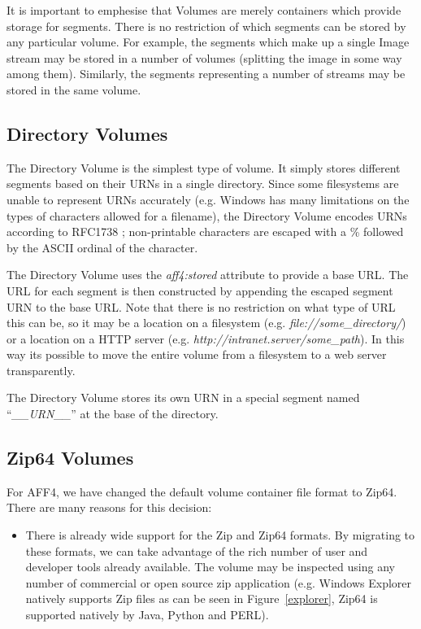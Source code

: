 \documentclass[10pt, conference]{IEEEtran}
\begin{document}
{{It is important to emphesise that Volumes are merely containers which
provide storage for segments. There is no restriction of which
segments can be stored by any particular volume. For example, the
segments which make up a single Image stream may be stored in a number
of volumes (splitting the image in some way among them). Similarly,
the segments representing a number of streams may be stored in the
same volume.

\subsection{Directory Volumes}
The Directory Volume is the simplest type of volume. It simply stores
different segments based on their URNs in a single directory. Since
some filesystems are unable to represent URNs accurately (e.g. Windows
has many limitations on the types of characters allowed for a
filename), the Directory Volume encodes URNs according to RFC1738
\cite{RFC1738}; non-printable characters are escaped with a \%
followed by the ASCII ordinal of the character.

The Directory Volume uses the {\em aff4:stored} attribute to provide a
base URL. The URL for each segment is then constructed by appending
the escaped segment URN to the base URL. Note that there is no
restriction on what type of URL this can be, so it may be a location
on a filesystem (e.g. {\em file://some\_directory/}) or a location on a
HTTP server (e.g. {\em http://intranet.server/some\_path}). In this
way its possible to move the entire volume from a filesystem to a web
server transparently.

The Directory Volume stores its own URN in a special segment named
``{\em \_\_URN\_\_}'' at the base of the directory.

\subsection{Zip64 Volumes}
For AFF4, we have changed the default volume container file format to
Zip64\cite{zip-format}. There are many reasons for this decision:

\begin{itemize}
\item There is already wide support for the Zip and Zip64 formats. By
  migrating to these formats, we can take advantage of the rich number
  of user and developer tools already available. The volume may be
  inspected using any number of commercial or open source zip
  application (e.g. Windows Explorer natively supports Zip files as
  can be seen in Figure~\ref{explorer}, Zip64 is supported natively
  by Java, Python and PERL).
 

\end{itemize}}}
\end{document}
